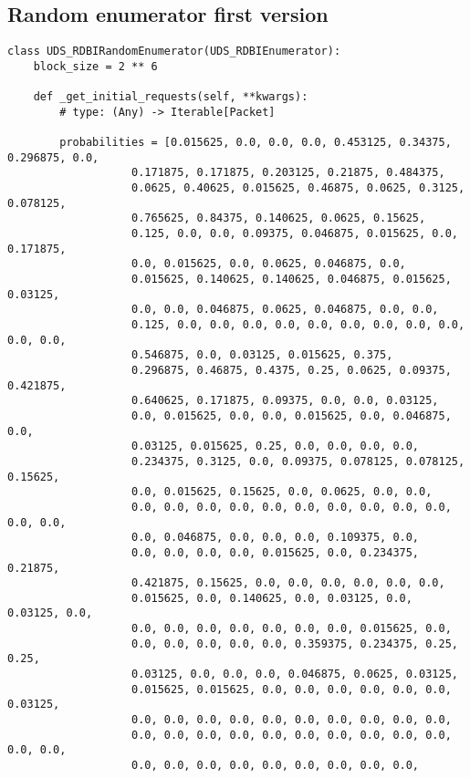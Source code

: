 \subsection{Random enumerator first version}
\label{app:random-not-compact}

\begin{verbatim}
class UDS_RDBIRandomEnumerator(UDS_RDBIEnumerator):
    block_size = 2 ** 6

    def _get_initial_requests(self, **kwargs):
        # type: (Any) -> Iterable[Packet]

        probabilities = [0.015625, 0.0, 0.0, 0.0, 0.453125, 0.34375, 0.296875, 0.0,
                   0.171875, 0.171875, 0.203125, 0.21875, 0.484375,
                   0.0625, 0.40625, 0.015625, 0.46875, 0.0625, 0.3125, 0.078125,
                   0.765625, 0.84375, 0.140625, 0.0625, 0.15625,
                   0.125, 0.0, 0.0, 0.09375, 0.046875, 0.015625, 0.0, 0.171875,
                   0.0, 0.015625, 0.0, 0.0625, 0.046875, 0.0,
                   0.015625, 0.140625, 0.140625, 0.046875, 0.015625, 0.03125,
                   0.0, 0.0, 0.046875, 0.0625, 0.046875, 0.0, 0.0,
                   0.125, 0.0, 0.0, 0.0, 0.0, 0.0, 0.0, 0.0, 0.0, 0.0, 0.0, 0.0,
                   0.546875, 0.0, 0.03125, 0.015625, 0.375,
                   0.296875, 0.46875, 0.4375, 0.25, 0.0625, 0.09375, 0.421875,
                   0.640625, 0.171875, 0.09375, 0.0, 0.0, 0.03125,
                   0.0, 0.015625, 0.0, 0.0, 0.015625, 0.0, 0.046875, 0.0,
                   0.03125, 0.015625, 0.25, 0.0, 0.0, 0.0, 0.0,
                   0.234375, 0.3125, 0.0, 0.09375, 0.078125, 0.078125, 0.15625,
                   0.0, 0.015625, 0.15625, 0.0, 0.0625, 0.0, 0.0,
                   0.0, 0.0, 0.0, 0.0, 0.0, 0.0, 0.0, 0.0, 0.0, 0.0, 0.0, 0.0,
                   0.0, 0.046875, 0.0, 0.0, 0.0, 0.109375, 0.0,
                   0.0, 0.0, 0.0, 0.0, 0.015625, 0.0, 0.234375, 0.21875,
                   0.421875, 0.15625, 0.0, 0.0, 0.0, 0.0, 0.0, 0.0,
                   0.015625, 0.0, 0.140625, 0.0, 0.03125, 0.0, 0.03125, 0.0,
                   0.0, 0.0, 0.0, 0.0, 0.0, 0.0, 0.0, 0.015625, 0.0,
                   0.0, 0.0, 0.0, 0.0, 0.0, 0.359375, 0.234375, 0.25, 0.25,
                   0.03125, 0.0, 0.0, 0.0, 0.046875, 0.0625, 0.03125,
                   0.015625, 0.015625, 0.0, 0.0, 0.0, 0.0, 0.0, 0.0, 0.03125,
                   0.0, 0.0, 0.0, 0.0, 0.0, 0.0, 0.0, 0.0, 0.0, 0.0,
                   0.0, 0.0, 0.0, 0.0, 0.0, 0.0, 0.0, 0.0, 0.0, 0.0, 0.0, 0.0,
                   0.0, 0.0, 0.0, 0.0, 0.0, 0.0, 0.0, 0.0, 0.0,

\end{verbatim}
